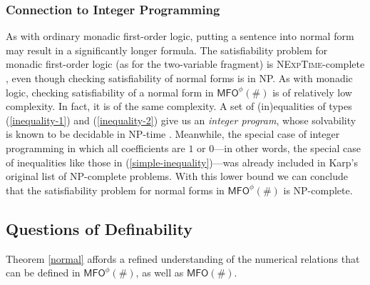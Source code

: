 \documentclass[12pt,oneside,reqno]{amsart}
\theoremstyle{definition}
\begin{document}
\subsubsection{Connection to Integer Programming} \label{integer} As with ordinary monadic first-order logic, putting a sentence into normal form may result in a significantly longer formula. The satisfiability problem for monadic first-order logic (as for the two-variable fragment) is \textsc{NExpTime}-complete \citep{Lewis1980}, even though checking satisfiability of normal forms is in NP. As with monadic logic, checking satisfiability of a normal form in $\mathsf{MFO}^\phi(\#)$ is of relatively low complexity. In fact, it is of the same complexity. A set of (in)equalities of types   (\ref{inequality-1}) and (\ref{inequality-2}) give us an \emph{integer program}, whose solvability is known to be decidable in NP-time \citep{borosh}. Meanwhile, the special case of integer programming in which all coefficients are $1$ or $0$---in other words, the special case of inequalities like those in (\ref{simple-inequality})---was already included in Karp's \citeyearpar{Karp1972} original list of NP-complete problems. With this lower bound we can conclude that the satisfiability problem for normal forms in $\mathsf{MFO}^\phi(\#)$ is NP-complete. 

\subsection{Questions of Definability} \label{section:mfodef} Theorem \ref{normal} affords a refined understanding of the numerical relations that can be defined in $\mathsf{MFO}^\phi(\#)$, as well as $\mathsf{MFO}(\#)$. %
\end{document}
